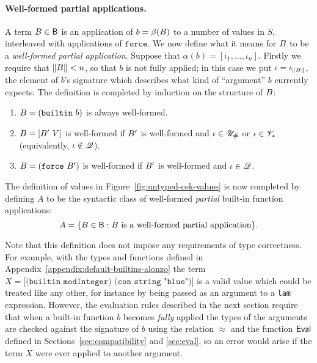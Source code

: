 \paragraph{Well-formed partial applications.} A term $B \in \mathsf{B}$ is
an application of $b = \beta(B)$ to a number of values in $S$, interleaved
with applications of $\texttt{force}$.  We now define what it means for $B$
to be a \textit{well-formed partial application}.  Suppose that $\alpha(b) =
[\iota_1, \ldots, \iota_n]$. Firstly we require that $\lVert B \rVert < n$, so
that $b$ is not fully applied; in this case we put
$\iota=\iota_{\lVert B \rVert}$, the element of $b$'s signature which describes
what kind of ``argument'' $b$ currently expects.  The definition is completed by
induction on the structure of $B$:
\begin{enumerate}
\item $B=\mathtt{(builtin}\ b \mathtt{)}$ is always well-formed.
\item $\pba=\mathtt{[}\pba'\ V\mathtt{]}$ is well-formed if $B'$ is
  well-formed and $\iota \in {\mathscr{U}_{\#}}$ or $\iota \in \mathscr{V}_*$ (equivalently, $\iota \notin \mathscr{Q}$).
\item $\pba=\mathtt{(force}\ \pba'\mathtt{)}$ is well-formed if $B'$ is
  well-formed and $\iota \in \mathscr{Q}$.
\end{enumerate}



\medskip
\noindent The definition of values in Figure~\ref{fig:untyped-cek-values} is now
completed by defining $A$ to be the syntactic class of well-formed
\textit{partial} built-in function applications:
$$
A = \{B \in \mathsf{B}: B \text{ is a well-formed partial application} \}.
$$

\noindent Note that this definition does not impose any requirements of type
correctness.  For example, with the types and functions defined in
Appendix~\ref{appendix:default-builtins-alonzo} the term $X =\texttt{[(builtin
    modInteger) (con string "blue")]}$ is a valid value which could be
treated like any other, for instance by being passed as an argument to a
\texttt{lam} expression.  However, the evaluation rules described in the next
section require that when a built-in function $b$ becomes \textit{fully} applied
the types of the arguments are checked against the signature of $b$ using the
relation $\approx$ and the function $\mathsf{Eval}$ defined in
Sections~\ref{sec:compatibility} and \ref{sec:eval}, so an error would arise if
the term $X$ were ever applied to another argument.
